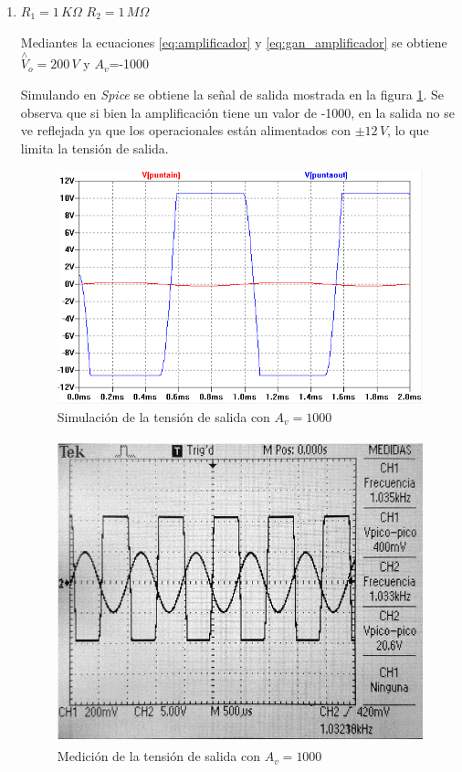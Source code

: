 \documentclass[10pt,spanish,a4paper,openany,notitlepage]{article}
\begin{document}
\begin{enumerate}
\begin{enumerate}
    \item $R_1 = 1\,\unit{K\Omega}$ $R_2 = 1\,\unit{M\Omega}$
    
    Mediantes la ecuaciones \ref{eq:amplificador} y \ref{eq:gan_amplificador} se obtiene $\overset{\wedge}{V}_o = 200\,\unit{V}$ y $A_v$=-1000
    
    Simulando en \emph{Spice} se obtiene la señal de salida mostrada en la figura \ref{fig:vo_1c}. Se observa que si bien la amplificación tiene un valor de -1000, en la
    salida no se ve reflejada ya que los operacionales están alimentados con $\pm 12\, \unit{V}$, lo que limita la tensión de salida.\\
    
    \begin{figure}[H]
    \centering
    \includegraphics[scale=0.8]{simulaciones/A1C.png}
    \caption{Simulación de la tensión de salida con $A_v = 1000$}
    \label{fig:vo_1c}
    \end{figure}
    
    \begin{figure}[H]
    \centering
    \includegraphics[width=350pt, height=250pt]{mediciones/A1c.jpg}
    \caption{Medición de la tensión de salida con $A_v = 1000$}
    \label{fig:vo_med_1c}
    \end{figure}
    

\end{enumerate}
\end{enumerate}
\end{document}
